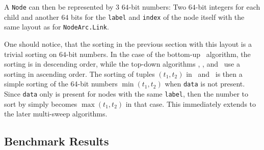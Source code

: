 A \lstinline{Node} can then be represented by $3$ $64$-bit numbers: Two $64$-bit
integers for each child and another $64$ bits for the \lstinline{label} and
\lstinline{index} of the node itself with the same layout as for
\lstinline{NodeArc.Link}.

One should notice, that the sorting in the previous section with this layout is
a trivial sorting on $64$-bit numbers. In the case of the bottom-up \Reduce\
algorithm, the sorting is in descending order, while the top-down algorithms
\Restrict, \Apply, and \Equal\ use a sorting in ascending order. The sorting of
tuples $(t_1,t_2)$ in \Apply\ and \Equal\ is then a simple sorting of the 64-bit
numbers $\min(t_1,t_2)$ when \lstinline{data} is not present. Since
\lstinline{data} only is present for nodes with the same \lstinline{label}, then
the number to sort by simply becomes $\max(t_1,t_2)$ in that case. This
immediately extends to the later multi-sweep algorithms.


\subsection{Benchmark Results} \label{sec:implementation__benchmarks}


